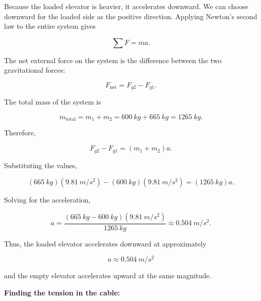 \begin{mdframed}[backgroundcolor=blue!10!white]
			Because the loaded elevator is heavier, it accelerates downward. We can choose downward for the loaded side as the positive direction. Applying Newton's second law to the entire system gives
			
			\begin{equation*}
				\sum F = ma.
			\end{equation*}
			
			The net external force on the system is the difference between the two gravitational forces:
			
			\begin{equation*}
				F_{\text{net}} = F_{g2}-F_{g1}.
			\end{equation*}
			
			The total mass of the system is
			
			\begin{equation*}
				m_{\text{total}} = m_1+m_2
				= \SI{600}{kg}+\SI{665}{kg}
				= \SI{1265}{kg}.
			\end{equation*}
			
			Therefore,
			
			\begin{equation*}
				F_{g2}-F_{g1} = (m_1+m_2)a.
			\end{equation*}
			
			Substituting the values,
			
			\begin{equation*}
				(\SI{665}{kg})(\SI{9.81}{m/s^2})
				-
				(\SI{600}{kg})(\SI{9.81}{m/s^2})
				=
				(\SI{1265}{kg})a.
			\end{equation*}
			
			Solving for the acceleration,
			
			\begin{equation*}
				a =
				\frac{(\SI{665}{kg}-\SI{600}{kg})(\SI{9.81}{m/s^2})}
				{\SI{1265}{kg}}
				\approx \SI{0.504}{m/s^2}.
			\end{equation*}
			
			Thus, the loaded elevator accelerates downward at approximately
			
			\begin{equation*}
				\boxed{a \approx \SI{0.504}{m/s^2}}
			\end{equation*}
			
			and the empty elevator accelerates upward at the same magnitude.
			
			\vspace{0.1in}
			
			\textbf{Finding the tension in the cable:}
			

\end{mdframed}

